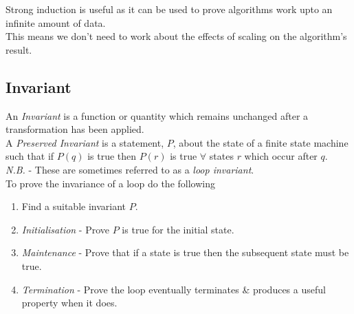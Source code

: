 \documentclass[11pt,a4paper]{article}
\begin{document}
Strong induction is useful as it can be used to prove algorithms work upto an infinite amount of data.\\
This means we don't need to work about the effects of scaling on the algorithm's result.

\subsection{Invariant}

An \textit{Invariant} is a function or quantity which remains unchanged after a transformation has been applied.\\

A \textit{Preserved Invariant} is a statement, $P$, about the state of a finite state machine such that if $P(q)$ is true then $P(r)$ is true $\forall$ states $r$  which occur after $q$.\\
\textit{N.B.} - These are sometimes referred to as a \textit{loop invariant}.\\
\newpage
{}
To prove the invariance of a loop do the following
\begin{enumerate}[label=\roman*)]
  \item Find a suitable invariant $P$.
  \item \textit{Initialisation} - Prove $P$ is true for the initial state.
  \item \textit{Maintenance} - Prove that if a state is true then the subsequent state must be true.
  \item \textit{Termination} - Prove the loop eventually terminates \& produces a useful property when it does.
\end{enumerate}
\end{document}
